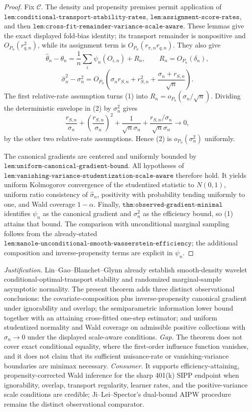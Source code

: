\documentclass{article}
\begin{document}
\begin{proof}
Fix \(\mathscr C\). The density and propensity premises permit application of \(\texttt{lem:conditional-transport-stability-rates}\), \(\texttt{lem:assignment-score-rates}\), and then \(\texttt{lem:cross-fit-remainder-variance-scale-aware}\). These lemmas give the exact displayed fold-bias identity; its transport remainder is nonpositive and \(O_{P_n}(r_{q,n}^2)\), while its assignment term is \(O_{P_n}(r_{\pi,n}r_{q,n})\). They also give
\[\widehat\theta_n-\theta_n=\frac1n\sum_i\psi_n(O_{i,n})+R_n,\qquad R_n=O_{P_n}(\delta_n),\tag{1}\]
\[\widehat\sigma_n^2-\sigma_n^2=O_{P_n}\!\left(\sigma_nr_{S,n}+r_{S,n}^2+\frac{\sigma_n+r_{S,n}}{\sqrt n}\right).\tag{2}\]
The first relative-rate assumption turns (1) into \(R_n=o_{P_n}(\sigma_n/\sqrt n)\). Dividing the deterministic envelope in (2) by \(\sigma_n^2\) gives
\[\frac{r_{S,n}}{\sigma_n}+\left(\frac{r_{S,n}}{\sigma_n}\right)^2+\frac1{\sqrt n\sigma_n}+\frac{r_{S,n}/\sigma_n}{\sqrt n\sigma_n}\to0,\tag{3}\]
by the other two relative-rate assumptions. Hence (2) is \(o_{P_n}(\sigma_n^2)\) uniformly.

The canonical gradients are centered and uniformly bounded by \(\texttt{lem:uniform-canonical-gradient-bound}\). All hypotheses of \(\texttt{lem:vanishing-variance-studentization-scale-aware}\) therefore hold. It yields uniform Kolmogorov convergence of the studentized statistic to \(N(0,1)\), uniform ratio consistency of \(\widehat\sigma_n\), positivity with probability tending uniformly to one, and Wald coverage \(1-\alpha\). Finally, \(\texttt{thm:observed-gradient-minimal}\) identifies \(\psi_n\) as the canonical gradient and \(\sigma_n^2\) as the efficiency bound, so (1) attains that bound. The comparison with unconditional marginal sampling follows from the already-stated \(\texttt{lem:manole-unconditional-smooth-wasserstein-efficiency}\); the additional composition and inverse-propensity terms are explicit in \(\psi_n\).
\end{proof}
\par\smallskip\noindent \textit{Justification.} Lin--Gao--Blanchet--Glynn already establish smooth-density wavelet conditional-optimal-transport stability and randomized marginal-sample asymptotic normality. The present theorem adds three distinct observational conclusions: the covariate-composition plus inverse-propensity canonical gradient under ignorability and overlap; the semiparametric information lower bound together with an attaining cross-fitted one-step estimator; and uniform studentized normality and Wald coverage on admissible positive collections with \(\sigma_n\to0\) under the displayed scale-aware conditions. \textit{Gap.} The theorem does not cover exact conditional equality, where the first-order influence function vanishes, and it does not claim that its sufficient nuisance-rate or vanishing-variance boundaries are minimax necessary. \textit{Consumer.} It supports efficiency-attaining, propensity-corrected Wald inference for the sharp 401(k) SIPP endpoint when ignorability, overlap, transport regularity, learner rates, and the positive-variance scale conditions are credible; Ji--Lei--Spector's dual-bound AIPW procedure remains the distinct observational comparator.
\end{document}
